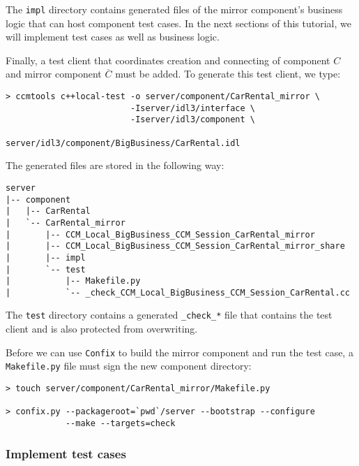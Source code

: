 The {\tt impl} directory contains generated files of the mirror
component's business logic that can host component test cases.
In the next sections of this tutorial, we will implement test cases as well
as business logic. 


Finally, a test client that coordinates creation and connecting of 
component $C$ and mirror component $\overline{C}$ must be added.
To generate this test client, we type:
\begin{small}
\begin{verbatim}
> ccmtools c++local-test -o server/component/CarRental_mirror \
                         -Iserver/idl3/interface \
                         -Iserver/idl3/component \
                         server/idl3/component/BigBusiness/CarRental.idl
\end{verbatim}
\end{small}

The generated files are stored in the following way:
\begin{small}
\begin{verbatim}
server
|-- component
|   |-- CarRental
|   `-- CarRental_mirror
|       |-- CCM_Local_BigBusiness_CCM_Session_CarRental_mirror
|       |-- CCM_Local_BigBusiness_CCM_Session_CarRental_mirror_share
|       |-- impl
|       `-- test
|           |-- Makefile.py
|           `-- _check_CCM_Local_BigBusiness_CCM_Session_CarRental.cc
\end{verbatim}
\end{small}

The {\tt test} directory contains a generated {\tt \_check\_*} file that 
contains the test client and is also protected from overwriting.

Before we can use {\tt Confix} to build the mirror component and run the
test case, a {\tt Makefile.py} file must sign the new component directory:
\begin{small}
\begin{verbatim}
> touch server/component/CarRental_mirror/Makefile.py

> confix.py --packageroot=`pwd`/server --bootstrap --configure 
            --make --targets=check 
\end{verbatim}
\end{small}


\newpage
\subsubsection{Implement test cases}

